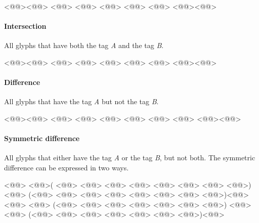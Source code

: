 \begin{RichListing}
<@\Token{\$[}@><@@> <@@> <@@> <@@> <@@> <@@> <@@><@\Token{]}@>
\end{RichListing}

\paragraph{Intersection}%
\label{par:intersection}


All glyphs that have both the tag \emph{A} and the tag \emph{B}.

\begin{RichListing}
<@\Token{\$[}@><@@> <@@> <@@> <@@> <@@> <@@> <@@><@\Token{]}@>
\end{RichListing}

\paragraph{Difference}%
\label{par:difference}


All glyphs that have the tag \emph{A} but not the tag \emph{B}.

\begin{RichListing}
<@\Token{\$[}@><@@> <@@> <@@> <@@> <@@> <@@> <@@> <@@><@\Token{]}@>
\end{RichListing}

\paragraph{Symmetric difference}%
\label{par:symmetric_difference}

All glyphs that either have the tag \emph{A} or the tag \emph{B}, but not both.
The symmetric difference can be expressed in two ways.


\begin{RichListing}
<@@>
<@\Token{\$[}@>(    <@@> <@@> <@@> <@@> <@@> <@@> <@@> <@@>) <@@>
  (<@@> <@@> <@@> <@@> <@@>     <@@> <@@> <@@>)<@\Token{]}@>
<@@>
<@\Token{\$[}@>    (<@@> <@@> <@@> <@@>  <@@> <@@> <@@>) <@@>
  <@@> (<@@> <@@> <@@> <@@> <@@> <@@> <@@>)<@\Token{]}@>
\end{RichListing}

